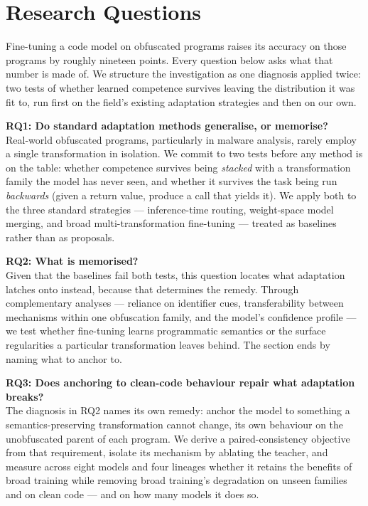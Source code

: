 \section{Research Questions}
\label{sec:rqs}

Fine-tuning a code model on obfuscated programs raises its accuracy on those programs by roughly
nineteen points. Every question below asks what that number is made of. We structure the
investigation as one diagnosis applied twice: two tests of whether learned competence survives
leaving the distribution it was fit to, run first on the field's existing adaptation strategies and
then on our own.

\vspace{0.5em}
\noindent
\textbf{RQ1: Do standard adaptation methods generalise, or memorise?} \\
Real-world obfuscated programs, particularly in malware analysis, rarely employ a single
transformation in isolation. We commit to two tests before any method is on the table: whether
competence survives being \emph{stacked} with a transformation family the model has never seen,
and whether it survives the task being run \emph{backwards} (given a return value, produce a call
that yields it). We apply both to the three standard strategies --- inference-time routing,
weight-space model merging, and broad multi-transformation fine-tuning --- treated as baselines
rather than as proposals.

\vspace{0.5em}
\noindent
\textbf{RQ2: What is memorised?} \\
Given that the baselines fail both tests, this question locates what adaptation latches onto
instead, because that determines the remedy. Through complementary analyses --- reliance on
identifier cues, transferability between mechanisms within one obfuscation family, and the model's
confidence profile --- we test whether fine-tuning learns programmatic semantics or the surface
regularities a particular transformation leaves behind. The section ends by naming what to anchor
to.

\vspace{0.5em}
\noindent
\textbf{RQ3: Does anchoring to clean-code behaviour repair what adaptation breaks?} \\
The diagnosis in RQ2 names its own remedy: anchor the model to something a semantics-preserving
transformation cannot change, its own behaviour on the unobfuscated parent of each program. We
derive a paired-consistency objective from that requirement, isolate its mechanism by ablating the
teacher, and measure across eight models and four lineages whether it retains the benefits of broad
training while removing broad training's degradation on unseen families and on clean code --- and
on how many models it does so.

